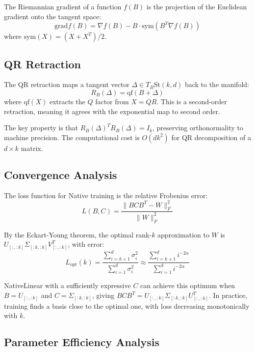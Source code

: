 \documentclass[11pt,a4paper]{article}
\begin{document}
The Riemannian gradient of a function $f(B)$ is the projection of the Euclidean gradient onto the tangent space:
\begin{equation}
\mathrm{grad} f(B) = \nabla f(B) - B \cdot \mathrm{sym}(B^T \nabla f(B))
\end{equation}
where $\mathrm{sym}(X) = (X + X^T)/2$.

\subsection{QR Retraction}

The QR retraction maps a tangent vector $\Delta \in T_B \mathrm{St}(k,d)$ back to the manifold:
\begin{equation}
R_B(\Delta) = \mathrm{qf}(B + \Delta)
\end{equation}
where $\mathrm{qf}(X)$ extracts the $Q$ factor from $X = QR$. This is a second-order retraction, meaning it agrees with the exponential map to second order.

The key property is that $R_B(\Delta)^T R_B(\Delta) = I_k$, preserving orthonormality to machine precision. The computational cost is $O(d k^2)$ for QR decomposition of a $d \times k$ matrix.

\subsection{Convergence Analysis}

The loss function for Native training is the relative Frobenius error:
\begin{equation}
L(B, C) = \frac{\|B C B^T - W\|_F^2}{\|W\|_F^2}
\end{equation}

By the Eckart-Young theorem, the optimal rank-$k$ approximation to $W$ is $U_{[:,:k]} \Sigma_{[:k,:k]} V_{[:,:k]}^T$, with error:
\begin{equation}
L_{\mathrm{opt}}(k) = \frac{\sum_{i=k+1}^d \sigma_i^2}{\sum_{i=1}^d \sigma_i^2} \approx \frac{\sum_{i=k+1}^d i^{-2\alpha}}{\sum_{i=1}^d i^{-2\alpha}}
\end{equation}

NativeLinear with a sufficiently expressive $C$ can achieve this optimum when $B = U_{[:,:k]}$ and $C = \Sigma_{[:k,:k]}$, giving $BCB^T = U_{[:,:k]} \Sigma_{[:k,:k]} U_{[:,:k]}^T$. In practice, training finds a basis close to the optimal one, with loss decreasing monotonically with $k$.

\subsection{Parameter Efficiency Analysis}
\end{document}

